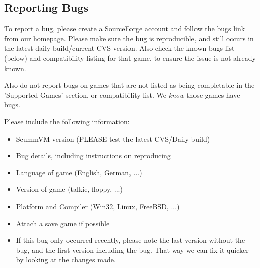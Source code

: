 \subsection{Reporting Bugs}

To report a bug, please create a SourceForge account and follow the bugs
link from our homepage. Please make sure the bug is reproducible, and
still occurs in the latest daily build/current CVS version. Also check
the known bugs list (below) and compatibility listing for that game, to
ensure the issue is not already known.

Also do not report bugs on games that are not listed as being completable
in the 'Supported Games' section, or compatibility list. We \textit{know} those
games have bugs.

Please include the following information:
\begin{itemize}
\item ScummVM version (PLEASE test the latest CVS/Daily build)
\item Bug details, including instructions on reproducing
\item Language of game (English, German, ...)
\item Version of game (talkie, floppy, ...)
\item Platform and Compiler (Win32, Linux, FreeBSD, ...)
\item Attach a save game if possible
\item If this bug only occurred recently, please note the last
          version without the bug, and the first version including
          the bug. That way we can fix it quicker by looking at the
          changes made.
\end{itemize}
